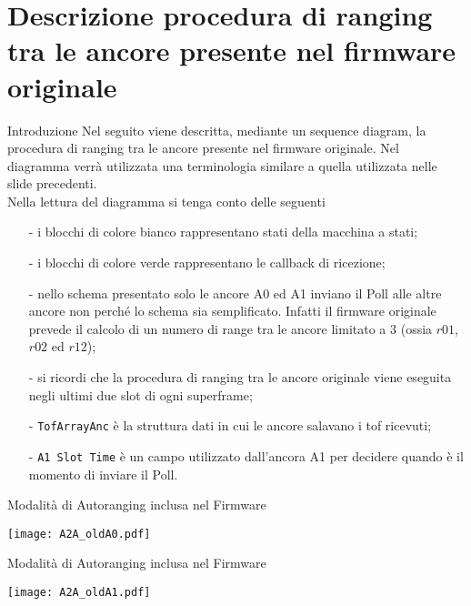 \section{Descrizione procedura di ranging tra le ancore presente nel firmware originale}
\begin{frame}[shrink=10]{Introduzione}
  Nel seguito viene descritta, mediante un sequence diagram, la procedura di ranging tra le ancore
  presente nel firmware originale. Nel diagramma verrà utilizzata una terminologia similare a quella utilizzata nelle slide precedenti.\\
  Nella lettura del diagramma si tenga conto delle seguenti
  \begin{itemize}
  \item[-] i blocchi di colore bianco rappresentano stati della macchina a stati;
  \item[-] i blocchi di colore verde rappresentano le callback di ricezione;
  \item[-] nello schema presentato \alert{solo} le ancore A0 ed A1 inviano il Poll alle altre ancore
    non perché lo schema sia semplificato. Infatti il firmware originale prevede
    il calcolo di un numero di range tra le ancore limitato a $3$ (ossia $r01$, $r02$ ed $r12$);
  \item[-] si ricordi che la procedura di ranging tra le ancore originale viene eseguita negli ultimi
    due slot di ogni superframe;
  \item[-] \lstinline!TofArrayAnc! è la struttura dati in cui le ancore salavano i tof ricevuti;
  \item[-] \lstinline!A1 Slot Time! è un campo utilizzato dall'ancora A1 per decidere quando è il momento
    di inviare il Poll.
  \end{itemize}
  
\end{frame}

\begin{frame}{Modalità di Autoranging inclusa nel Firmware}  
  \begin{center}
    \texttt{[image: A2A\_oldA0.pdf]}
  \end{center}
\end{frame}

\begin{frame}{Modalità di Autoranging inclusa nel Firmware}
  \begin{center}
    \texttt{[image: A2A\_oldA1.pdf]}
  \end{center}
\end{frame}

